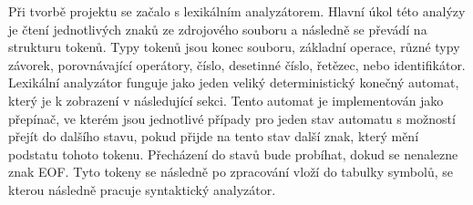 \documentclass[../main.tex]{subfiles}
\begin{document}
Při tvorbě projektu se začalo s lexikálním analyzátorem. Hlavní úkol této analýzy je čtení jednotlivých znaků ze zdrojového souboru a následně se převádí na strukturu tokenů. Typy tokenů jsou konec souboru, základní operace, různé typy závorek, porovnávající operátory, číslo, desetinné číslo, řetězec, nebo identifikátor.\\
Lexikální analyzátor funguje jako jeden veliký deterministický konečný automat, který je k zobrazení v následující sekci. Tento automat je implementován jako přepínač, ve kterém jsou jednotlivé případy pro jeden stav automatu s možností přejít do dalšího stavu, pokud přijde na tento stav další znak, který mění podstatu tohoto tokenu. Přecházení do stavů bude probíhat, dokud se nenalezne znak EOF. Tyto tokeny se následně po zpracování vloží do tabulky symbolů, se kterou následně pracuje syntaktický analyzátor.
\end{document}
